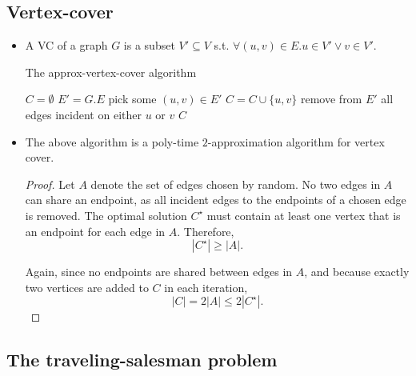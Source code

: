 \subsection{Vertex-cover}
\begin{itemize}
\item A VC of a graph $G$ is a subset $V' \subseteq V$ s.t. $\forall
  (u,v) \in E. u \in V' \lor v \in V'$.
\begin{algorithm}
\caption{The approx-vertex-cover algorithm}
\begin{algorithmic}[1]
  \State $C = \emptyset$
  \State $E' = G.E$
    \State pick some $(u,v) \in E'$
    \State $C = C \cup \{u,v\}$
    \State remove from $E'$ all edges incident on either $u$ or $v$
  \EndWhile
  \State \Return $C$
\EndProcedure
\end{algorithmic}
\end{algorithm}
\item The above algorithm is a poly-time $2$-approximation algorithm
  for vertex cover.
\begin{proof}
  Let $A$ denote the set of edges chosen by random. No two edges in
  $A$ can share an endpoint, as all incident edges to the endpoints of
  a chosen edge is removed. The optimal solution $C^\star$ must
  contain at least one vertex that is an endpoint for each edge in
  $A$. Therefore, $$|C^\star| \geq |A|.$$

  Again, since no endpoints are shared between edges in $A$, and
  because exactly two vertices are added to $C$ in each
  iteration, $$|C| = 2|A| \leq 2|C^\star|.$$
\end{proof}
\end{itemize}

\subsection{The traveling-salesman problem}

